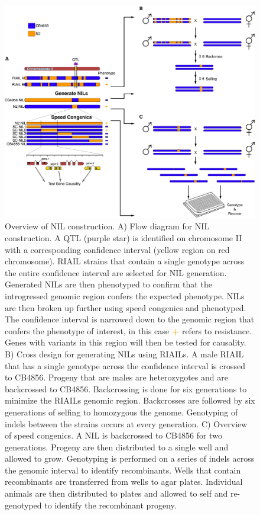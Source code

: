 \documentclass[12pt]{article}
\begin{document}
\begin{figure}[h]
\renewcommand{\thefigure}{A.\arabic{figure}}
\centering
\includegraphics[scale=0.3]{Figures/Appendix_NILs.pdf}
\vspace{10pt}
\caption[Cross designs for NIL generation]{Overview of NIL construction. A) Flow diagram for NIL construction. A QTL (purple star) is identified on chromosome II with a corresponding confidence interval (yellow region on red chromosome). RIAIL strains that contain a single genotype across the entire confidence interval are selected for NIL generation. Generated NILs are then phenotyped to confirm that the introgressed genomic region confers the expected phenotype. NILs are then broken up further using speed congenics and phenotyped. The confidence interval is narrowed down to the genomic region that confers the phenotype of interest, in this case {\bf \textcolor{orange}{+}} refers to resistance. Genes with variants in this region will then be tested for causality. B) Cross design for generating NILs using RIAILs. A male RIAIL that has a single genotype across the confidence interval is crossed to CB4856. Progeny that are males are heterozygotes and are backcrossed to CB4856. Backcrossing is done for six generations to minimize the RIAILs genomic region. Backcrosses are followed by six generations of selfing to homozygous the genome. Genotyping of indels between the strains occurs at every generation. C) Overview of speed congenics. A NIL is backcrossed to CB4856 for two generations. Progeny are then distributed to a single well and allowed to grow. Genotyping is performed on a series of indels across the genomic interval to identify recombinants. Wells that contain recombinants are transferred from wells to agar plates. Individual animals are then distributed to plates and allowed to self and re-genotyped to identify the recombinant progeny. }


\label{NILs}
\end{figure}
\end{document}
